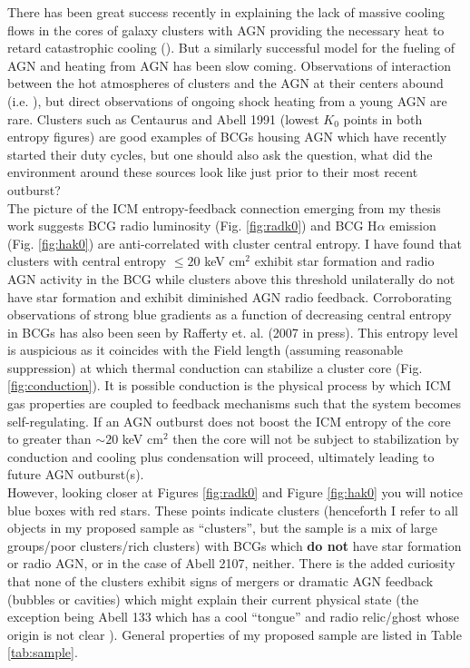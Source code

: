 \documentclass[11pt]{article}
\begin{document}
There has been great success recently in explaining the lack of
massive cooling flows in the cores of galaxy clusters with AGN providing
the necessary heat to retard catastrophic cooling
(\cite{2007ARA&A..45..117M}). But a similarly successful model for the
fueling of AGN and heating from AGN has been slow
coming. Observations of interaction between the hot atmospheres of
clusters and the AGN at their centers abound
(i.e. \cite{2004ApJ...607..800B}), but direct observations of ongoing shock
heating from a young AGN are rare. Clusters such as Centaurus and
Abell 1991 (lowest $K_0$ points in both entropy figures) are good
examples of BCGs housing AGN which have recently started their duty
cycles, but one should also ask the question, what did the environment
around these sources look like just prior to their most recent
outburst?\\

The picture of the ICM entropy-feedback connection emerging from my
thesis work suggests BCG radio luminosity (Fig. \ref{fig:radk0}) and
BCG H$\alpha$ emission (Fig. \ref{fig:hak0}) are anti-correlated with
cluster central entropy. I have found that clusters with central
entropy $\leq 20$ keV cm$^2$ exhibit star formation and radio AGN activity
in the BCG while clusters above this threshold unilaterally do not
have star formation and exhibit diminished AGN radio
feedback. Corroborating observations of strong blue gradients as a
function of decreasing central entropy in BCGs has also been seen by
Rafferty et. al. (2007 in press). This entropy level is auspicious as
it coincides with the Field length (assuming reasonable suppression)
at which thermal conduction can stabilize a cluster core
(Fig. \ref{fig:conduction}). It is possible conduction is the physical
process by which ICM gas properties are coupled to feedback mechanisms
such that the system becomes self-regulating. If an AGN outburst does
not boost the ICM entropy of the core to greater than $\sim 20 $ keV
cm$^{2}$ then the core will not be subject to stabilization by
conduction and cooling plus condensation will proceed, ultimately
leading to future AGN outburst(s).\\

However, looking closer at Figures \ref{fig:radk0} and Figure
\ref{fig:hak0} you will notice blue boxes with red stars. These points
indicate clusters (henceforth I refer to all objects in my proposed sample as
``clusters'', but the sample is a mix of large groups/poor
clusters/rich clusters) with BCGs which {\bf do not} have star
formation or radio AGN, or in the case of Abell 2107, neither. There
is the added curiosity that none of the clusters exhibit signs of
mergers or dramatic AGN feedback (bubbles or cavities) which might
explain their current physical state (the exception being Abell 133
which has a cool ``tongue'' and radio relic/ghost whose origin is not
clear \cite{2004ApJ...616..157F}). General properties of my proposed
sample are listed in Table \ref{tab:sample}.\\ 
\end{document}
